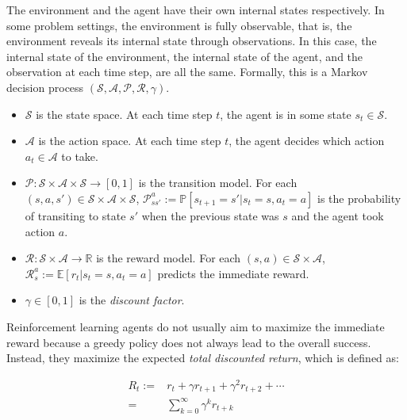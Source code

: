         The environment and the agent have their own internal states respectively.
        In some problem settings, the environment is fully observable,
        that is, the environment reveals its internal state through observations.
        In this case, the internal state of the environment, the internal state of the agent,
        and the observation at each time step, are all the same.
        Formally, this is a Markov decision process $(\mathcal{S}, \mathcal{A}, \mathcal{P}, \mathcal{R}, \gamma)$.

        \begin{itemize}
            \item $\mathcal{S}$ is the state space.
                At each time step $t$, the agent is in some state $s_t \in \mathcal{S}$.
            \item $\mathcal{A}$ is the action space.
                At each time step $t$, the agent decides which action $a_t \in \mathcal{A}$ to take.
            \item $\mathcal{P}: \mathcal{S}\times\mathcal{A}\times\mathcal{S} \rightarrow [0,1]$
                is the transition model.
                For each $(s, a, s') \in \mathcal{S}\times\mathcal{A}\times\mathcal{S}$,
                $\mathcal{P}_{ss'}^a := \mathbb{P}[s_{t+1} = s' | s_t = s, a_t = a]$ is the probability of
                transiting to state $s'$ when the previous state was $s$ and the agent took action $a$.
            \item $\mathcal{R}: \mathcal{S} \times \mathcal{A} \rightarrow \mathbb{R}$ is the reward model.
                For each $(s, a) \in \mathcal{S} \times \mathcal{A}$,
                $\mathcal{R}_s^a := \mathbb{E}[r_{t} | s_t=s, a_t=a]$ predicts the immediate reward.
            \item $\gamma \in [0, 1]$ is the \emph{discount factor}.
        \end{itemize}
        
        Reinforcement learning agents do not usually aim to maximize the immediate reward
        because a greedy policy does not always lead to the overall success.
        Instead, they maximize the expected \emph{total discounted return}, which is defined as:

        \begin{align*}
            R_t :=& r_{t} + \gamma r_{t+1} + \gamma^2 r_{t+2} + \cdots \\
            =& \sum_{k=0}^{\infty} \gamma^k r_{t+k}
        \end{align*}

